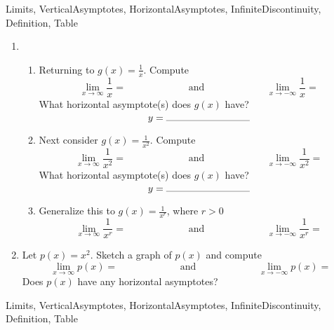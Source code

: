 \begin{tagblock}{Limits, VerticalAsymptotes, HorizontalAsymptotes, InfiniteDiscontinuity, Definition, Table}
\begin{question}
\begin{enumerate}
\item 
\begin{enumerate}
\item Returning to $\displaystyle g(x) = \frac{1}{x}$.   Compute 
\[ \lim_{x \to \infty} \frac{1}{x} = \hspace{1in} \text{ and }  \hspace{1in} \lim_{x \to -\infty} \frac{1}{x} = \]
What horizontal asymptote(s) does $g(x)$ have?
\[y = \rule{3cm}{.1mm} \]

\bigskip

\item Next consider $\displaystyle g(x) = \frac{1}{x^2}$.   Compute 
\[ \lim_{x \to \infty} \frac{1}{x^2} = \hspace{1in} \text{ and }  \hspace{1in} \lim_{x \to -\infty} \frac{1}{x^2} = \]
What horizontal asymptote(s) does $g(x)$ have?
\[y = \rule{3cm}{.1mm} \]


\item Generalize this to  $\displaystyle g(x) = \frac{1}{x^r}$, where $r>0$
\[ \lim_{x \to \infty} \frac{1}{x^r} = \hspace{1in} \text{ and }  \hspace{1in} \lim_{x \to -\infty} \frac{1}{x^r} = \]
\end{enumerate}

\bigskip
  
\item Let $p(x)=x^2$.  Sketch a graph of $p(x)$ and compute
\[ \lim_{x \to \infty} p(x) = \hspace{1in} \text{ and }  \hspace{1in} \lim_{x \to -\infty} p(x) = \]
Does $p(x)$ have any horizontal asymptotes?



\end{enumerate}

\vspace{1.5in}






	
	
\begin{tags}
	    Limits, VerticalAsymptotes, HorizontalAsymptotes, InfiniteDiscontinuity, Definition, Table
\end{tags}
	
\begin{diary}
	    
\end{diary}
	
\begin{solution}
	  
\end{solution}
	
\end{question}

\end{tagblock}

